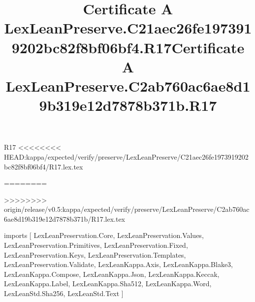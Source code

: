 \begin{lexlean}{R17}
<<<<<<<< HEAD:kappa/expected/verify/preserve/LexLeanPreserve/C21aec26fe1973919202bc82f8bf06bf4/R17.lex.tex
\title{Certificate A LexLeanPreserve.C21aec26fe1973919202bc82f8bf06bf4.R17}
========
\title{Certificate A LexLeanPreserve.C2ab760ac6ae8d19b319e12d7878b371b.R17}
>>>>>>>> origin/release/v0.5:kappa/expected/verify/preserve/LexLeanPreserve/C2ab760ac6ae8d19b319e12d7878b371b/R17.lex.tex
\begin{coremodule}
imports [
  LexLeanPreservation.Core,
  LexLeanPreservation.Values,
  LexLeanPreservation.Primitives,
  LexLeanPreservation.Fixed,
  LexLeanPreservation.Keys,
  LexLeanPreservation.Templates,
  LexLeanPreservation.Validate,
  LexLeanKappa.Axis,
  LexLeanKappa.Blake3,
  LexLeanKappa.Compose,
  LexLeanKappa.Json,
  LexLeanKappa.Keccak,
  LexLeanKappa.Label,
  LexLeanKappa.Sha512,
  LexLeanKappa.Word,
  LexLeanStd.Sha256,
  LexLeanStd.Text
]


\end{coremodule}
\end{lexlean}
